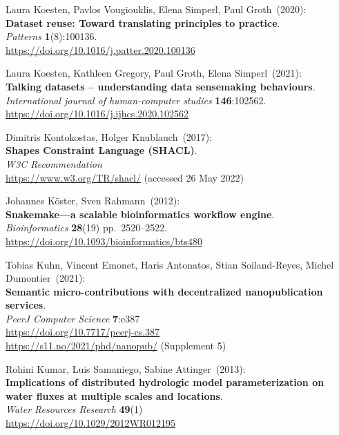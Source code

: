 \begin{thebibliography}{9}
Laura Koesten, Pavlos Vougiouklis, Elena Simperl, Paul Groth~(2020): \\
\textbf{Dataset reuse: Toward translating principles to practice}.\\
\emph{Patterns} \textbf{1}(8):100136.\\
\url{https://doi.org/10.1016/j.patter.2020.100136}

Laura Koesten, Kathleen Gregory, Paul Groth, Elena Simperl~(2021): \\
\textbf{Talking datasets -- understanding data sensemaking behaviours}.\\
\emph{International journal of human-computer studies}
\textbf{146}:102562.\\
\url{https://doi.org/10.1016/j.ijhcs.2020.102562}

Dimitris Kontokostas, Holger Knublauch~(2017): \\
\textbf{Shapes {Constraint Language} ({SHACL})}.\\
\emph{W3C Recommendation}\\
\url{https://www.w3.org/TR/shacl/} (accessed 26 May 2022)

Johannes Köster, Sven Rahmann~(2012): \\
\textbf{Snakemake—a scalable bioinformatics workflow engine}.\\
\emph{Bioinformatics} \textbf{28}(19) pp.~2520--2522.\\
\url{https://doi.org/10.1093/bioinformatics/bts480}

Tobias Kuhn, Vincent Emonet, Haris Antonatos, Stian Soiland-Reyes, Michel Dumontier~(2021): \\
\textbf{Semantic micro-contributions with decentralized nanopublication services}.\\
\emph{PeerJ Computer Science} \textbf{7}:e387\\
\url{https://doi.org/10.7717/peerj-cs.387} \\
\url{https://s11.no/2021/phd/nanopub/} (Supplement 5)

Rohini Kumar, Luis Samaniego, Sabine Attinger~(2013): \\
\textbf{Implications of distributed hydrologic model parameterization on water fluxes at multiple scales and locations}.\\
\emph{Water Resources Research} \textbf{49}(1) \\
\url{https://doi.org/10.1029/2012WR012195}


\end{thebibliography}
